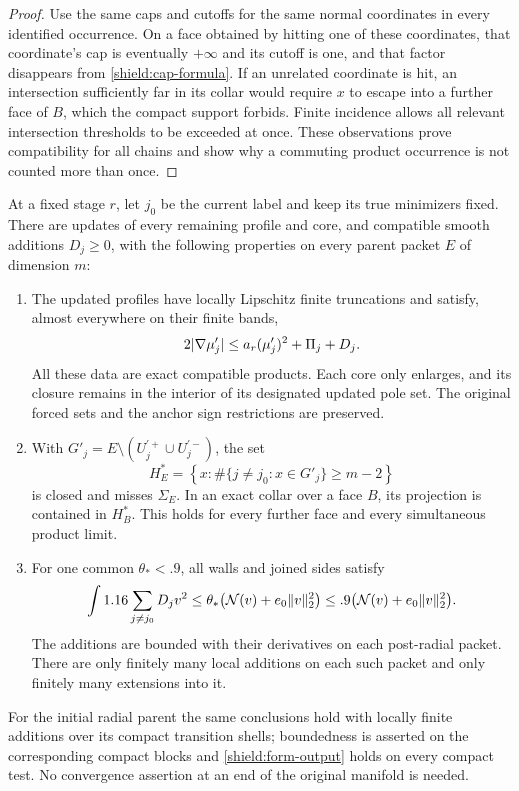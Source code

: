 \begin{proof}
Use the same caps and cutoffs for the same normal coordinates in every
identified occurrence.  On a face obtained by hitting one of these
coordinates, that coordinate's cap is eventually $+\infty$ and its
cutoff is one, and that factor disappears from
\cref{shield:cap-formula}.  If an unrelated coordinate is hit, an
intersection sufficiently far in its collar would require $x$ to
escape into a further face of $B$, which the compact support forbids.
Finite incidence allows all relevant intersection thresholds to be
exceeded at once.  These observations prove compatibility for all
chains and show why a commuting product occurrence is not counted
more than once.
\end{proof}

\begin{proposition}\label{shield:global}
At a fixed stage $r$, let $j_0$ be the current label and keep its true
minimizers fixed.  There are updates of every remaining profile and
core, and compatible smooth additions $D_j\ge0$, with the following
properties on every parent packet $E$ of dimension $m$:
\begin{enumerate}[label=\textup{(\roman*)}]
\item The updated profiles have locally Lipschitz finite truncations
and satisfy, almost everywhere on their finite bands,
\begin{equation}\label{shield:profile-output}
 2\lvert\nabla\mu'_j\rvert\le a_r(\mu'_j)^2+\Pi_j+D_j.
\end{equation}
All these data are exact compatible products.  Each core only enlarges,
and its closure remains in the interior of its designated updated pole
set.  The original forced sets and the anchor sign restrictions are
preserved.
\item With $G'_j=E\setminus(U_j^{\prime+}\cup U_j^{\prime-})$, the set
\begin{equation}\label{shield:guard-output}
 H_E^*=\left\{x:\#\{j\ne j_0:x\in G'_j\}\ge m-2\right\}
\end{equation}
is closed and misses $\Sigma_E$.  In an exact collar over a face $B$,
its projection is contained in $H_B^*$.  This holds for every further
face and every simultaneous product limit.
\item For one common $\theta_*<.9$, all walls and joined sides satisfy
\begin{equation}\label{shield:form-output}
 \int 1.16\sum_{j\ne j_0}D_jv^2
 \le\theta_*\bigl(\mathcal N(v)+e_0\lVert v\rVert_2^2\bigr)
 \le .9\bigl(\mathcal N(v)+e_0\lVert v\rVert_2^2\bigr).
\end{equation}
The additions are bounded with their derivatives on each post-radial
packet.  There are only finitely many local additions on each such
packet and only finitely many extensions into it.
\end{enumerate}
For the initial radial parent the same conclusions hold with locally
finite additions over its compact transition shells; boundedness is
asserted on the corresponding compact blocks and
\cref{shield:form-output} holds on every compact test.  No convergence
assertion at an end of the original manifold is needed.
\end{proposition}

